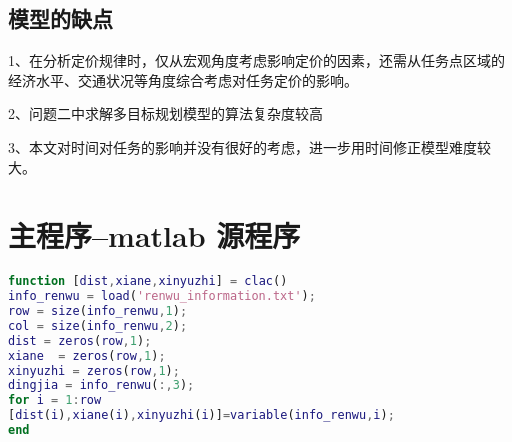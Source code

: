 \documentclass{cumcmthesis}
\begin{document}
\subsection{模型的缺点}

1、在分析定价规律时，仅从宏观角度考虑影响定价的因素，还需从任务点区域的 经济水平、交通状况等角度综合考虑对任务定价的影响。 

2、问题二中求解多目标规划模型的算法复杂度较高

3、本文对时间对任务的影响并没有很好的考虑，进一步用时间修正模型难度较大。








\newpage
\appendix
\section{主程序--matlab 源程序}
\begin{lstlisting}[language=matlab]
function [dist,xiane,xinyuzhi] = clac()
info_renwu = load('renwu_information.txt');
row = size(info_renwu,1);
col = size(info_renwu,2);
dist = zeros(row,1);
xiane  = zeros(row,1);
xinyuzhi = zeros(row,1);
dingjia = info_renwu(:,3);
for i = 1:row
[dist(i),xiane(i),xinyuzhi(i)]=variable(info_renwu,i); 
end

 \end{lstlisting}
\end{document}
